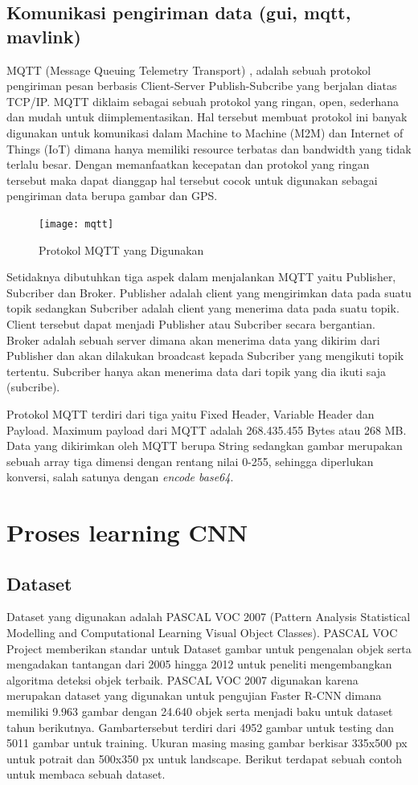 \subsection{ Komunikasi pengiriman data (gui, mqtt, mavlink)}
MQTT (Message Queuing Telemetry Transport) \cite{banks2014mqtt}, adalah sebuah protokol pengiriman pesan berbasis Client-Server Publish-Subcribe yang berjalan diatas TCP/IP. MQTT diklaim sebagai sebuah protokol yang ringan, open, sederhana dan mudah untuk diimplementasikan. Hal tersebut membuat protokol ini banyak digunakan untuk komunikasi dalam Machine to Machine (M2M) dan Internet of Things (IoT) dimana hanya memiliki resource terbatas dan bandwidth yang tidak terlalu besar. Dengan memanfaatkan kecepatan dan protokol yang ringan tersebut maka dapat dianggap hal tersebut cocok untuk digunakan sebagai pengiriman data berupa gambar dan GPS.

\begin{figure}[ht]
 \centering
 \texttt{[image: mqtt]}
 \caption{Protokol MQTT yang Digunakan}
 \label{fig:mqtt}   
\end{figure}

Setidaknya dibutuhkan tiga aspek dalam menjalankan MQTT yaitu Publisher, Subcriber dan Broker. Publisher adalah client yang mengirimkan data pada suatu topik sedangkan Subcriber adalah client yang menerima data pada suatu topik. Client tersebut dapat menjadi Publisher atau Subcriber secara bergantian. Broker adalah sebuah server dimana akan menerima data yang dikirim dari Publisher dan akan dilakukan broadcast kepada Subcriber yang mengikuti topik tertentu. Subcriber hanya akan menerima data dari topik yang dia ikuti saja (subcribe). 

Protokol MQTT terdiri dari tiga yaitu Fixed Header, Variable Header dan Payload. Maximum payload dari MQTT adalah 268.435.455 Bytes atau 268 MB. Data yang dikirimkan oleh MQTT berupa String sedangkan gambar merupakan sebuah array tiga dimensi dengan rentang nilai 0-255, sehingga diperlukan konversi, salah satunya dengan \textit{encode base64}. 

\section{ Proses learning CNN    }
\subsection{ Dataset}
Dataset yang digunakan adalah PASCAL VOC 2007 \cite{Everingham10} (Pattern Analysis Statistical Modelling and Computational Learning Visual Object Classes). PASCAL VOC Project memberikan standar untuk Dataset gambar untuk pengenalan objek serta mengadakan tantangan dari 2005 hingga 2012 untuk peneliti mengembangkan algoritma deteksi objek terbaik. PASCAL VOC 2007 digunakan karena merupakan dataset yang digunakan untuk pengujian Faster R-CNN dimana memiliki 9.963 gambar dengan 24.640 objek serta menjadi baku untuk dataset tahun berikutnya. Gambartersebut terdiri dari 4952 gambar untuk testing dan 5011 gambar untuk training. Ukuran masing masing gambar berkisar 335x500 px untuk potrait dan 500x350 px untuk landscape. Berikut terdapat sebuah contoh untuk membaca sebuah dataset.

